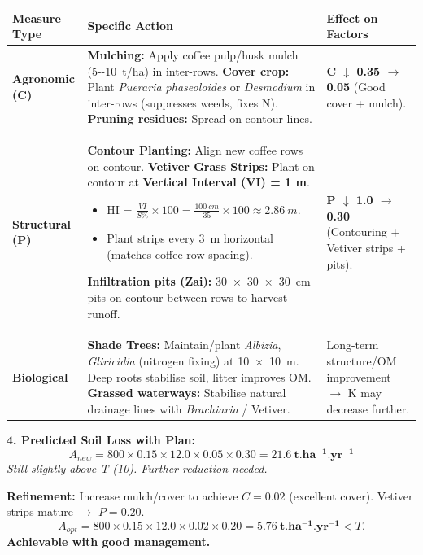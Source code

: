 \documentclass[11pt]{article}
\begin{document}
\begin{exoresolu}
\begin{center}
\begin{tabularx}{\linewidth}{|l|X|l|}\hline
\rowcolor{popblueL}
\textbf{Measure Type} & \textbf{Specific Action} & \textbf{Effect on Factors} \\ \hline
\textbf{Agronomic (C)} & \textbf{Mulching:} Apply coffee pulp/husk mulch (\SI{5--10}{t/ha}) in inter-rows. \textbf{Cover crop:} Plant \textit{Pueraria phaseoloides} or \textit{Desmodium} in inter-rows (suppresses weeds, fixes N). \textbf{Pruning residues:} Spread on contour lines. & \textbf{C $\downarrow$ 0.35 $\rightarrow$ 0.05} (Good cover + mulch). \\ \hline
\textbf{Structural (P)} & \textbf{Contour Planting:} Align new coffee rows on contour. \textbf{Vetiver Grass Strips:} Plant on contour at \textbf{Vertical Interval (VI) = 1 m}. 
      \begin{itemize}
      \item HI = $\frac{VI}{S\%} \times 100 = \frac{100\ cm}{35} \times 100 \approx \SI{2.86}{m}$.
      \item Plant strips every \SI{3}{m} horizontal (matches coffee row spacing).
      \end{itemize}
      \textbf{Infiltration pits (Zai):} \SI{30x30x30}{cm} pits on contour between rows to harvest runoff. & \textbf{P $\downarrow$ 1.0 $\rightarrow$ 0.30} (Contouring + Vetiver strips + pits). \\ \hline
\textbf{Biological} & \textbf{Shade Trees:} Maintain/plant \textit{Albizia}, \textit{Gliricidia} (nitrogen fixing) at \SI{10x10}{m}. Deep roots stabilise soil, litter improves OM. \textbf{Grassed waterways:} Stabilise natural drainage lines with \textit{Brachiaria} / Vetiver. & Long-term structure/OM improvement $\rightarrow$ K may decrease further. \\ \hline
\end{tabularx}
\end{center}

\noindent\textbf{4. Predicted Soil Loss with Plan:}
\[
A_{new} = 800 \times 0.15 \times 12.0 \times \mathbf{0.05} \times \mathbf{0.30} = \mathbf{21.6\ t.ha^{-1}.yr^{-1}}
\]
\textit{Still slightly above T (10). Further reduction needed.}

\noindent\textbf{Refinement:} Increase mulch/cover to achieve $C = 0.02$ (excellent cover). Vetiver strips mature $\rightarrow$ $P = 0.20$.
\[
A_{opt} = 800 \times 0.15 \times 12.0 \times 0.02 \times 0.20 = \mathbf{5.76\ t.ha^{-1}.yr^{-1}} < T.
\]
\textbf{Achievable with good management.}


\end{exoresolu}
\end{document}
